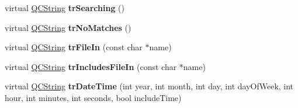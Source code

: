 \begin{DoxyCompactItemize}
\item 
\hypertarget{class_translator_chinese_aea79f5912e787bbb2c441223ccd382c6}{virtual \hyperlink{class_q_c_string}{Q\-C\-String} {\bfseries tr\-Searching} ()}\label{class_translator_chinese_aea79f5912e787bbb2c441223ccd382c6}

\item 
\hypertarget{class_translator_chinese_a240e49b617153456e0f29bef561cc10f}{virtual \hyperlink{class_q_c_string}{Q\-C\-String} {\bfseries tr\-No\-Matches} ()}\label{class_translator_chinese_a240e49b617153456e0f29bef561cc10f}

\item 
\hypertarget{class_translator_chinese_acf964d17bad4c55c393193fe9708575f}{virtual \hyperlink{class_q_c_string}{Q\-C\-String} {\bfseries tr\-File\-In} (const char $\ast$name)}\label{class_translator_chinese_acf964d17bad4c55c393193fe9708575f}

\item 
\hypertarget{class_translator_chinese_a53f57c6e2aa0b9dc09bc47b3746d3481}{virtual \hyperlink{class_q_c_string}{Q\-C\-String} {\bfseries tr\-Includes\-File\-In} (const char $\ast$name)}\label{class_translator_chinese_a53f57c6e2aa0b9dc09bc47b3746d3481}

\item 
\hypertarget{class_translator_chinese_a19c43671f677ae0445fca1fe7a5f62cc}{virtual \hyperlink{class_q_c_string}{Q\-C\-String} {\bfseries tr\-Date\-Time} (int year, int month, int day, int day\-Of\-Week, int hour, int minutes, int seconds, bool include\-Time)}\label{class_translator_chinese_a19c43671f677ae0445fca1fe7a5f62cc}


\end{DoxyCompactItemize}
